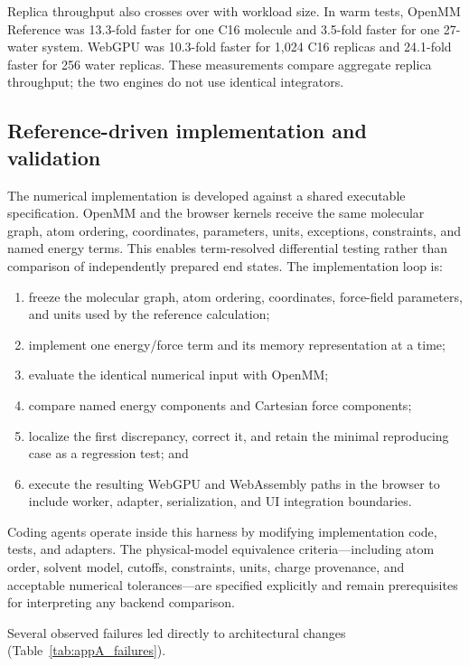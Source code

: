 \documentclass[11pt]{article}
\begin{document}
\begin{small}
Replica throughput also crosses over with workload size. In warm tests, OpenMM Reference was 13.3-fold faster for one C16 molecule and 3.5-fold faster for one 27-water system. WebGPU was 10.3-fold faster for 1,024 C16 replicas and 24.1-fold faster for 256 water replicas. These measurements compare aggregate replica throughput; the two engines do not use identical integrators.

\subsection{Reference-driven implementation and validation}

The numerical implementation is developed against a shared executable specification. OpenMM and the browser kernels receive the same molecular graph, atom ordering, coordinates, parameters, units, exceptions, constraints, and named energy terms. This enables term-resolved differential testing rather than comparison of independently prepared end states. The implementation loop is:

\begin{enumerate}[leftmargin=*]
\item freeze the molecular graph, atom ordering, coordinates, force-field parameters, and units used by the reference calculation;
\item implement one energy/force term and its memory representation at a time;
\item evaluate the identical numerical input with OpenMM;
\item compare named energy components and Cartesian force components;
\item localize the first discrepancy, correct it, and retain the minimal reproducing case as a regression test; and
\item execute the resulting WebGPU and WebAssembly paths in the browser to include worker, adapter, serialization, and UI integration boundaries.
\end{enumerate}

Coding agents operate inside this harness by modifying implementation code, tests, and adapters. The physical-model equivalence criteria---including atom order, solvent model, cutoffs, constraints, units, charge provenance, and acceptable numerical tolerances---are specified explicitly and remain prerequisites for interpreting any backend comparison.

Several observed failures led directly to architectural changes (Table~\ref{tab:appA_failures}).


\end{small}
\end{document}
